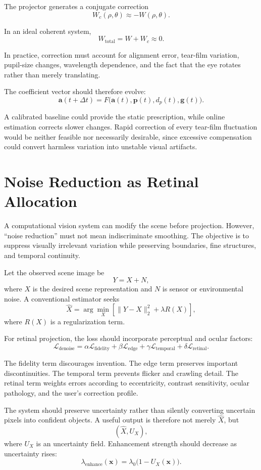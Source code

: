 \documentclass[11pt]{article}
\begin{document}
The projector generates a conjugate correction
\[
W_c(\rho,\theta)\approx -W(\rho,\theta).
\]

In an ideal coherent system,
\[
W_{\mathrm{total}}=W+W_c\approx 0.
\]

In practice, correction must account for alignment error, tear-film variation, pupil-size changes, wavelength dependence, and the fact that the eye rotates rather than merely translating.

The coefficient vector should therefore evolve:
\[
\mathbf{a}(t+\Delta t)=F\bigl(\mathbf{a}(t),\mathbf{p}(t),d_p(t),\mathbf{g}(t)\bigr).
\]

A calibrated baseline could provide the static prescription, while online estimation corrects slower changes. Rapid correction of every tear-film fluctuation would be neither feasible nor necessarily desirable, since excessive compensation could convert harmless variation into unstable visual artifacts.

\section{Noise Reduction as Retinal Allocation}

A computational vision system can modify the scene before projection. However, ``noise reduction'' must not mean indiscriminate smoothing. The objective is to suppress visually irrelevant variation while preserving boundaries, fine structures, and temporal continuity.

Let the observed scene image be
\[
Y=X+N,
\]
where $X$ is the desired scene representation and $N$ is sensor or environmental noise. A conventional estimator seeks
\[
\widehat{X}=\arg\min_X\left[\|Y-X\|_2^2+\lambda R(X)\right],
\]
where $R(X)$ is a regularization term.

For retinal projection, the loss should incorporate perceptual and ocular factors:
\[
\mathcal{L}_{\mathrm{denoise}}=\alpha\mathcal{L}_{\mathrm{fidelity}}+\beta\mathcal{L}_{\mathrm{edge}}+\gamma\mathcal{L}_{\mathrm{temporal}}+\delta\mathcal{L}_{\mathrm{retinal}}.
\]

The fidelity term discourages invention. The edge term preserves important discontinuities. The temporal term prevents flicker and crawling detail. The retinal term weights errors according to eccentricity, contrast sensitivity, ocular pathology, and the user's correction profile.

The system should preserve uncertainty rather than silently converting uncertain pixels into confident objects. A useful output is therefore not merely $\widehat{X}$, but
\[
(\widehat{X},U_X),
\]
where $U_X$ is an uncertainty field. Enhancement strength should decrease as uncertainty rises:
\[
\lambda_{\mathrm{enhance}}(\mathbf{x})=\lambda_0\bigl(1-U_X(\mathbf{x})\bigr).
\]
\end{document}
